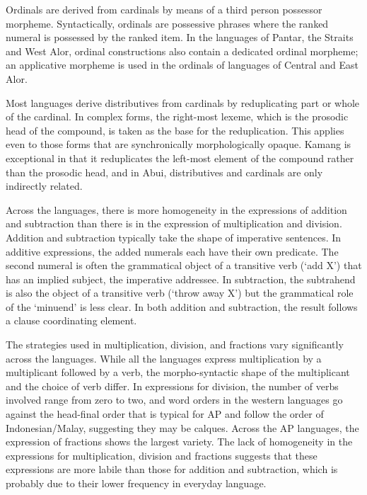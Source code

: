 Ordinals are derived from cardinals by means of a third person possessor morpheme. Syntactically, ordinals are possessive phrases where the ranked numeral is possessed by the ranked item. In the languages of Pantar, the Straits and West Alor, ordinal constructions also contain a dedicated ordinal morpheme; an applicative morpheme is used in the ordinals of languages of Central and East Alor. 

Most languages derive distributives from cardinals by reduplicating part or whole of the cardinal. In complex forms, the right-most lexeme, which is the prosodic head of the compound, is taken as the base for the reduplication. This applies even to those forms that are synchronically morphologically opaque. Kamang is exceptional in that it reduplicates the left-most element of the compound rather than the prosodic head, and in Abui, distributives and cardinals are only indirectly related. 

Across the languages, there is more homogeneity in the expressions of addition and subtraction than there is in the expression of multiplication and division. Addition and subtraction typically take the shape of imperative sentences. In additive expressions, the added numerals each have their own predicate. The second numeral is often the grammatical object of a transitive verb (`add X') that has an implied subject, the imperative addressee. In subtraction, the subtrahend is also the object of a transitive verb (`throw away X') but the grammatical role of the `minuend' is less clear. In both addition and subtraction, the result follows a clause coordinating element.

The strategies used in multiplication, division, and fractions vary significantly across the languages. While all the languages express multiplication by a multiplicant followed by a verb, the morpho-syntactic shape of the multiplicant and the choice of verb differ. In expressions for division, the number of verbs involved range from zero to two, and word orders in the western languages go against the head-final order that is typical for AP and follow the order of Indonesian/Malay, suggesting they may be calques. Across the AP languages, the expression of fractions shows the largest variety. The lack of homogeneity in the expressions for multiplication, division and fractions suggests that these expressions are more labile than those for addition and subtraction, which is probably due to their lower frequency in everyday language.

